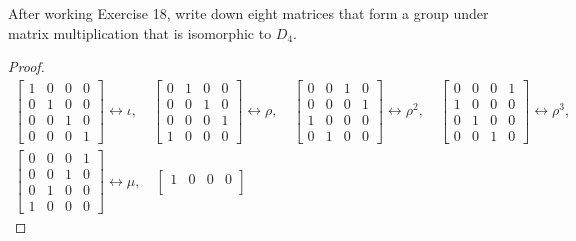 \begin{exercise}
    After working Exercise 18, write down eight matrices that form a group under matrix multiplication that is isomorphic to $D_{4}$.
\end{exercise}

\begin{proof}
    \[
        \begin{split}
            \begin{bmatrix}
                1 & 0 & 0 & 0 \\
                0 & 1 & 0 & 0 \\
                0 & 0 & 1 & 0 \\
                0 & 0 & 0 & 1
            \end{bmatrix}\leftrightarrow\iota,\quad
            \begin{bmatrix}
                0 & 1 & 0 & 0 \\
                0 & 0 & 1 & 0 \\
                0 & 0 & 0 & 1 \\
                1 & 0 & 0 & 0
            \end{bmatrix}\leftrightarrow\rho,\quad
            \begin{bmatrix}
                0 & 0 & 1 & 0 \\
                0 & 0 & 0 & 1 \\
                1 & 0 & 0 & 0 \\
                0 & 1 & 0 & 0
            \end{bmatrix}\leftrightarrow\rho^{2},\quad
            \begin{bmatrix}
                0 & 0 & 0 & 1 \\
                1 & 0 & 0 & 0 \\
                0 & 1 & 0 & 0 \\
                0 & 0 & 1 & 0
            \end{bmatrix}\leftrightarrow\rho^{3}, \\
            \begin{bmatrix}
                0 & 0 & 0 & 1 \\
                0 & 0 & 1 & 0 \\
                0 & 1 & 0 & 0 \\
                1 & 0 & 0 & 0
            \end{bmatrix}\leftrightarrow\mu,\quad
            \begin{bmatrix}
                1 & 0 & 0 & 0 \\

\end{bmatrix}
\end{split}\]
\end{proof}
